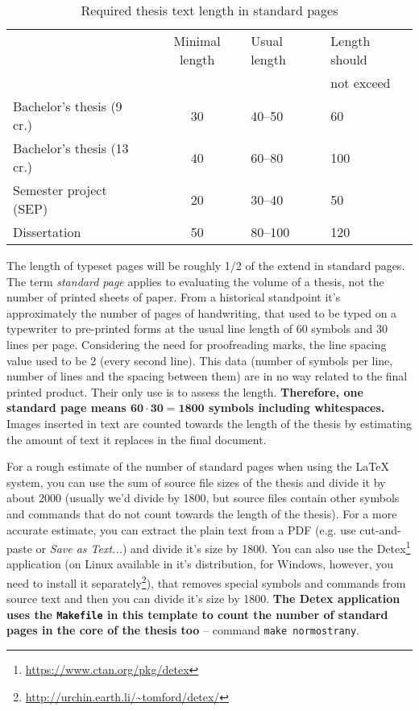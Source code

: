 \begin{table}[hbt]
\centering
\caption{Required thesis text length in standard pages}
\label{rozsah}
\begin{tabular}{|l|c|l|l|}
\hline
 & Minimal length & Usual length & Length should \\
 &  &  & not exceed  \\ \hline
Bachelor's thesis (9 cr.) & 30 & 40--50 & 60 \\ \hline
Bachelor's thesis (13 cr.) & 40 & 60--80 & 100 \\ \hline
Semester project (SEP) & 20 & 30--40 & 50 \\ \hline
Dissertation & 50 & 80--100 & 120 \\ \hline
\end{tabular}
\end{table}

The length of typeset pages will be roughly 1/2 of the extend in standard pages. The term {\it standard page} applies to evaluating the volume of a thesis, not the number of printed sheets of paper. From a historical standpoint it's approximately the number of pages of handwriting, that used to be typed on a typewriter to pre-printed forms at the usual line length of 60 symbols and 30 lines per page. Considering the need for proofreading marks, the line spacing value used to be 2 (every second line). This data (number of symbols per line, number of lines and the spacing between them) are in no way related to the final printed product. Their only use is to assess the length. \textbf{Therefore, one standard page means $\mathbf{60\cdot 30 = 1800}$ symbols including whitespaces.} Images inserted in text are counted towards the length of the thesis by estimating the amount of text it replaces in the final document.

For a rough estimate of the number of standard pages when using the \LaTeX{} system, you can use the sum of source file sizes of the thesis and divide it by about 2000 (usually we'd divide by 1800, but source files contain other symbols and commands that do not count towards the length of the thesis). For a more accurate estimate, you can extract the plain text from a PDF (e.g. use cut-and-paste or {\it Save as Text...}) and divide it's size by 1800. You can also use the Detex\footnote{\url{https://www.ctan.org/pkg/detex}} application (on Linux available in it's distribution, for Windows, however, you need to install it separately\footnote{\url{http://urchin.earth.li/~tomford/detex/}}), that removes special symbols and commands from source text and then you can divide it's size by 1800. \textbf{The Detex application uses the \texttt{Makefile} in this template to count the number of standard pages in the core of the thesis too} -- command \verb|make normostrany|.

